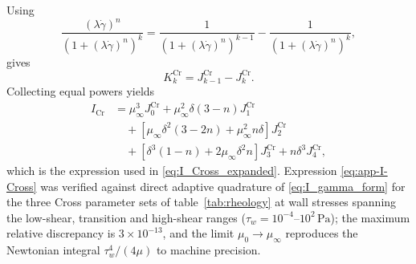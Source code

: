 \documentclass[lineno]{jfm}
\begin{document}
Using
\begin{equation}
\frac{(\lambda\dot{\gamma})^n}
{\left(1+(\lambda\dot{\gamma})^n\right)^k}
=
\frac{1}
{\left(1+(\lambda\dot{\gamma})^n\right)^{k-1}}
-
\frac{1}
{\left(1+(\lambda\dot{\gamma})^n\right)^k},
\end{equation}
gives
\begin{equation}
K_k^{\mathrm{Cr}}
=
J_{k-1}^{\mathrm{Cr}}
-
J_k^{\mathrm{Cr}}.
\label{eq:app-KJ-Cross}
\end{equation}
Collecting equal powers yields
\begin{align}
I_{\mathrm{Cr}}
&=
\mu_{\infty}^3J_0^{\mathrm{Cr}}
+\mu_{\infty}^2\delta(3-n)J_1^{\mathrm{Cr}}
\nonumber\\
&\quad
+\left[
\mu_{\infty}\delta^2(3-2n)
+\mu_{\infty}^2n\delta
\right]J_2^{\mathrm{Cr}}
\nonumber\\
&\quad
+\left[
\delta^3(1-n)
+2\mu_{\infty}\delta^2n
\right]J_3^{\mathrm{Cr}}
+n\delta^3J_4^{\mathrm{Cr}},
\label{eq:app-I-Cross}
\end{align}
which is the expression used in \eqref{eq:I_Cross_expanded}.
Expression \eqref{eq:app-I-Cross} was verified against direct adaptive
quadrature of \eqref{eq:I_gamma_form} for the three Cross parameter sets of
table~\ref{tab:rheology} at wall stresses spanning the low-shear, transition
and high-shear ranges ($\tau_w=10^{-4}$--$10^{2}\,\mathrm{Pa}$); the maximum
relative discrepancy is $3\times10^{-13}$, and the limit
$\mu_0\rightarrow\mu_\infty$ reproduces the Newtonian integral
$\tau_w^4/(4\mu)$ to machine precision.
\end{document}

